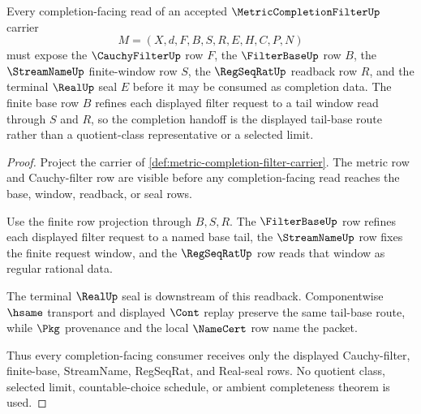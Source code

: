 \begin{theorem}
\label{thm:metric-completion-filter-tail-base}
Every completion-facing read of an accepted $\MetricCompletionFilterUp$ carrier
$$
M=(X,d,F,B,S,R,E,H,C,P,N)
$$
must expose the $\CauchyFilterUp$ row $F$, the $\FilterBaseUp$ row $B$, the $\StreamNameUp$ finite-window row $S$, the $\RegSeqRatUp$ readback row $R$, and the terminal $\RealUp$ seal $E$ before it may be consumed as completion data. The finite base row $B$ refines each displayed filter request to a tail window read through $S$ and $R$, so the completion handoff is the displayed tail-base route rather than a quotient-class representative or a selected limit.
\end{theorem}
\begin{proof}
Project the carrier of \autoref{def:metric-completion-filter-carrier}. The metric row and Cauchy-filter row are visible before any completion-facing read reaches the base, window, readback, or seal rows.

Use the finite row projection through $B,S,R$. The $\FilterBaseUp$ row refines each displayed filter request to a named base tail, the $\StreamNameUp$ row fixes the finite request window, and the $\RegSeqRatUp$ row reads that window as regular rational data.

The terminal $\RealUp$ seal is downstream of this readback. Componentwise $\hsame$ transport and displayed $\Cont$ replay preserve the same tail-base route, while $\Pkg$ provenance and the local $\NameCert$ row name the packet.

Thus every completion-facing consumer receives only the displayed Cauchy-filter, finite-base, StreamName, RegSeqRat, and Real-seal rows. No quotient class, selected limit, countable-choice schedule, or ambient completeness theorem is used.
\end{proof}

